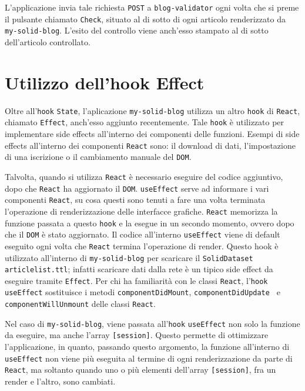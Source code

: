 \bigskip

L'applicazione invia tale richiesta {\tt POST} a {\tt blog-validator} ogni volta che si preme il pulsante chiamato {\tt Check}, situato al di sotto di ogni articolo renderizzato da {\tt my-solid-blog}. L'esito del controllo viene anch'esso stampato al di sotto dell'articolo controllato.


\bigskip

\section{Utilizzo dell'hook Effect}

\bigskip

Oltre all'{\tt hook} {\tt State}, l'aplicazione {\tt my-solid-blog} utilizza un altro {\tt hook} di {\tt React}, chiamato {\tt Effect}, anch'esso aggiunto recentemente. Tale {\tt hook} è utilizzato per implementare side effects all'interno dei componenti delle funzioni. Esempi di side effects  all'interno dei componenti {\tt React} sono: il download di dati, l'impostazione di una iscrizione o il cambiamento manuale del {\tt DOM}.

\bigskip

Talvolta, quando si utilizza {\tt React} è necessario eseguire del codice aggiuntivo, dopo che {\tt React} ha aggiornato il {\tt DOM}. {\tt useEffect} serve ad informare i vari componenti {\tt React}, su cosa questi sono tenuti a fare una volta terminata l'operazione di renderizzazione delle interfacce grafiche. {\tt React} memorizza la funzione passata a questo {\tt hook} e la esegue in un secondo momento, ovvero dopo che il {\tt DOM} è stato aggiornato. Il codice all'interno {\tt useEffect} viene di default eseguito ogni volta che {\tt React} termina l'operazione di render. Questo hook è utilizzato all'interno di {\tt my-solid-blog} per scaricare il {\tt SolidDataset} {\tt articlelist.ttl}; infatti scaricare dati dalla rete è un tipico side effect da eseguire tramite {\tt Effect}. Per chi ha familiarità con le classi {\tt React}, l'{\tt hook} {\tt useEffect} sostituisce i metodi {\tt componentDidMount}, {\tt componentDidUpdate } e {\tt componentWillUnmount} delle classi {\tt React}.

\bigskip

Nel caso di {\tt my-solid-blog}, viene passata all'{\tt hook} {\tt useEffect} non solo la funzione da eseguire, ma anche l'array {\tt [session]}. Questo permette di ottimizzare l'applicazione, in quanto, passando questo argomento, la funzione all'interno di {\tt useEffect} non viene più eseguita al termine di ogni renderizzazione da parte di {\tt React}, ma soltanto quando uno o più elementi dell'array {\tt [session]}, fra un render e l'altro, sono cambiati.

